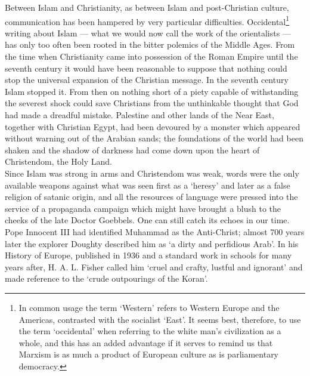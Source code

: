 \documentclass[10pt, twoside,openright]{book}
\begin{document}
Between Islam and Christianity, as between Islam and post\hyp{}Christian culture, communication has been hampered by very particular difficulties. Occidental\footnote{In common usage the term `Western' refers to Western Europe and the Americas, contrasted with the socialist `East'. It seems best, therefore, to use the term `occidental' when referring to the white man's civilization as a whole, and this has an added advantage if it serves to remind us that Marxism is as much a product of European culture as is parliamentary democracy.} writing about Islam --- what we would now call the work of the orientalists --- has only too often been rooted in the bitter polemics of the Middle Ages. From the time when Christianity came into possession of the Roman Empire until the seventh century it would have been reasonable to suppose that nothing could stop the universal expansion of the Christian message. In the seventh century Islam stopped it. From then on nothing short of a piety capable of withstanding the severest shock could save Christians from the unthinkable thought that God had made a dreadful mistake. Palestine and other lands of the Near East, together with Christian Egypt, had been devoured by a monster which appeared without warning out of the Arabian sands; the foundations of the world had been shaken and the shadow of darkness had come down upon the heart of Christendom, the Holy Land. \\

Since Islam was strong in arms and Christendom was weak, words were the only available weapons against what was seen first as a `heresy' and later as a false religion of satanic origin, and all the resources of language were pressed into the service of a propaganda campaign which might have brought a blush to the cheeks of the late Doctor Goebbels. One can still catch its echoes in our time. Pope Innocent III had identified Muhammad as the Anti\hyp{}Christ; almost 700 years later the explorer Doughty described him as `a dirty and perfidious Arab'. In his History of Europe, published in 1936 and a standard work in schools for many years after, H. A. L. Fisher called him `cruel and crafty, lustful and ignorant' and made reference to the `crude outpourings of the Koran'. \\
\end{document}
